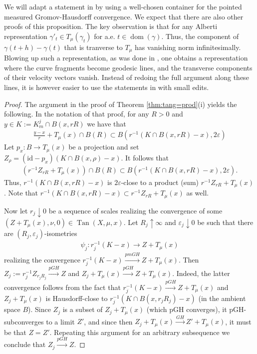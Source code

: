 \documentclass{amsart}
\numberwithin{equation}{section}
\newcommand{\dom}{\operatorname{dom}}
\newcommand{\id}{\mathrm {id}}
\newcommand{\inv}{^{-1}}
\newcommand{\Tan}{\operatorname{Tan}}
\begin{document}
We will adapt a statement in \cite{CKS} by using a well-chosen container for the pointed measured Gromov-Hausdorff convergence. We expect that there are also other proofs of this proposition. The key observation is that for any Alberti representation $\gamma'_t\in T_\mu(\gamma_t)$ for a.e. $t\in \dom(\gamma)$. Thus, the component of $\gamma(t+h)-\gamma(t)$ that is tranverse to $T_\mu$ has vanishing norm infinitesimally. Blowing up such a representation, as was done in \cite{CKS}, one obtains a representation where the curve fragments become geodesic lines, and the transverse components of their velocity vectors vanish. Instead of redoing the full argument along these lines, it is however easier to use the statements in \cite{CKS} with small edits.

\begin{proof}
The argument in the proof of Theorem \ref{thm:tang=prod}(i) yields the following. In the notation of that proof, for any $R>0$ and  $y\in K:=K_m^j\cap B(x,rR)$  we have that
\begin{align*}
\frac{y-x}{r}+T_\mu(x)\cap B(R)\subset B(r\inv(K\cap B(x,rR)-x),2\varepsilon)
\end{align*}
Let $p_x:B\to T_\mu(x)$ be a projection and set $Z_\rho=(\id-p_x)(K\cap B(x,\rho)-x)$. It follows that 
\begin{align*}
(r\inv Z_{rR}+T_\mu(x))\cap B(R)\subset B(r\inv(K\cap B(x,rR)-x),2\varepsilon).
\end{align*}
Thus, $r\inv(K\cap B(x,rR)-x)$ is $2\varepsilon$-close to a product (sum) $r\inv  Z_{rR}+T_\mu(x)$. Note that $r\inv(K\cap B(x,rR)-x)\subset r\inv Z_{rR}+T_\mu(x)$ as well.

Now let $r_j\downarrow 0$ be a sequence of scales realizing the convergence of some $(Z+T_\mu(x),\nu,0)\in \Tan(X,\mu,x)$.  Let $R_j\uparrow\infty$  and $\varepsilon_j\downarrow 0$ be such that there are $(R_j,\varepsilon_j)$-isometries 
\begin{align*}
\psi_j:r_j\inv(K-x)\to Z+T_\mu(x)
\end{align*}
realizing the convergence $r_j\inv(K-x)\stackrel{pmGH}{\longrightarrow}Z+T_\mu(x)$. Then $Z_j:=r_j\inv Z_{r_jR_j}\stackrel{pGH}{\longrightarrow}Z$ and $Z_j+T_\mu(x)\stackrel{pGH}{\longrightarrow}Z+T_\mu(x)$.  
Indeed, the latter convergence follows from the fact that $r_j\inv(K-x)\stackrel{pGH}{\longrightarrow}Z+T_\mu(x)$ and $Z_j+T_\mu(x)$ is Hausdorff-close to $r_j\inv(K\cap B(x,r_jR_j)-x)$ (in the ambient space $B$). Since $Z_j$ is a subset of $Z_j+T_\mu(x)$ (which pGH converges), it pGH-subconverges to a limit $Z'$, and since then $Z_j+T_\mu(x)\stackrel{GH}{\longrightarrow}Z'+T_\mu(x)$, it must be that $Z=Z'$. Repeating this argument for an arbitrary subsequence we conclude that $Z_j\stackrel{pGH}{\longrightarrow}Z$. 


\end{proof}
\end{document}
